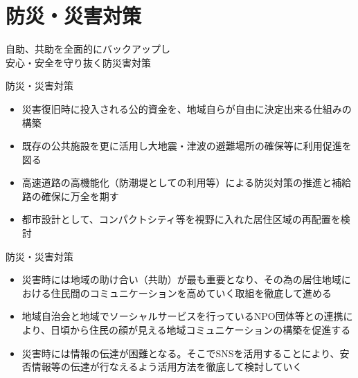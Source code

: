 \documentclass[dvipdfmx]{beamer}
\begin{document}
\section{防災・災害対策}
    \begin{frame}{}{}
        \sectionpage
        \begin{center}
            \begin{large}
                \alert{自助、共助を全面的にバックアップし}\\\alert{安心・安全を守り抜く防災害対策}
            \end{large}
        \end{center}
    \end{frame}

    \begin{frame}{防災・災害対策}{}
        \begin{small}
            \begin{itemize}
                \setlength{\parsep}{.5mm}
                \setlength{\itemsep}{2mm}
                \item 災害復旧時に投入される公的資金を、地域自らが自由に決定出来る仕組みの構築
                \item 既存の公共施設を更に活用し大地震・津波の避難場所の確保等に利用促進を図る
                \item 高速道路の高機能化（防潮堤としての利用等）による防災対策の推進と補給路の確保に万全を期す
                \item 都市設計として、コンパクトシティ等を視野に入れた居住区域の再配置を検討
            \end{itemize}
        \end{small}
    \end{frame}

    \begin{frame}{防災・災害対策}{}
        \begin{small}
            \begin{itemize}
                \setlength{\parsep}{.5mm}
                \setlength{\itemsep}{2mm}
                \item 災害時には地域の助け合い（共助）が最も重要となり、その為の居住地域における住民間のコミュニケーションを高めていく取組を徹底して進める
                \item 地域自治会と地域でソーシャルサービスを行っているNPO団体等との連携により、日頃から住民の顔が見える地域コミュニケーションの構築を促進する
                \item 災害時には情報の伝達が困難となる。そこでSNSを活用することにより、安否情報等の伝達が行なえるよう活用方法を徹底して検討していく
            \end{itemize}
        \end{small}
    \end{frame}
    
\end{document}
